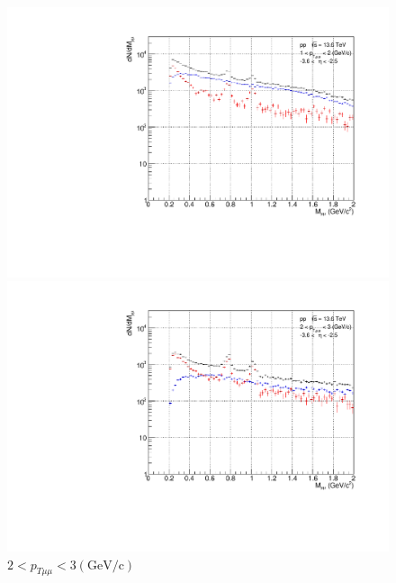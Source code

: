                 \begin{figure}[H]
                    \centering
                    \begin{minipage}{0.45\textwidth}
                        \centering
                        \includegraphics[width=\textwidth]{fig/3_4_1_CB_pt_1to2.pdf}
                        \caption*{$1 < p_{T\mu\mu} < 2 (\mathrm{GeV/c})$}
                    \end{minipage}
                    \hfill
                    \begin{minipage}{0.45\textwidth}
                        \centering
                        \includegraphics[width=\textwidth]{fig/3_4_1_CB_pt_2to3.pdf}
                        \caption*{$2 < p_{T\mu\mu} < 3 (\mathrm{GeV/c})$}
                    \end{minipage}

\end{figure}
